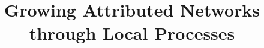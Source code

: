 \documentclass[sigconf]{acmart}
\begin{document}
\title{Growing Attributed Networks through Local Processes}



\begin{abstract}

\end{abstract}


\maketitle

















\clearpage



\end{document}
